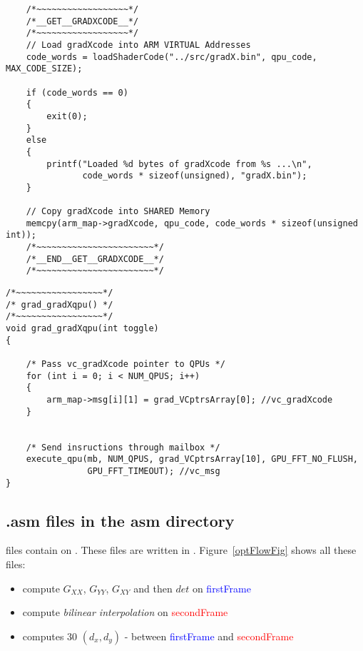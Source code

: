 \begin{lstlisting}
    /*~~~~~~~~~~~~~~~~~~*/
    /*__GET__GRADXCODE__*/
    /*~~~~~~~~~~~~~~~~~~*/
    // Load gradXcode into ARM VIRTUAL Addresses
    code_words = loadShaderCode("../src/gradX.bin", qpu_code, MAX_CODE_SIZE);

    if (code_words == 0)
    {
        exit(0);
    }
    else
    {
        printf("Loaded %d bytes of gradXcode from %s ...\n",
               code_words * sizeof(unsigned), "gradX.bin");
    }

    // Copy gradXcode into SHARED Memory
    memcpy(arm_map->gradXcode, qpu_code, code_words * sizeof(unsigned int));
    /*~~~~~~~~~~~~~~~~~~~~~~~*/
    /*__END__GET__GRADXCODE__*/
    /*~~~~~~~~~~~~~~~~~~~~~~~*/
\end{lstlisting}

\begin{lstlisting}
/*~~~~~~~~~~~~~~~~~*/
/* grad_gradXqpu() */
/*~~~~~~~~~~~~~~~~~*/
void grad_gradXqpu(int toggle)
{

    /* Pass vc_gradXcode pointer to QPUs */
    for (int i = 0; i < NUM_QPUS; i++)
    {
        arm_map->msg[i][1] = grad_VCptrsArray[0]; //vc_gradXcode
    }


    /* Send insructions through mailbox */
    execute_qpu(mb, NUM_QPUS, grad_VCptrsArray[10], GPU_FFT_NO_FLUSH,
                GPU_FFT_TIMEOUT); //vc_msg
}
\end{lstlisting}


\subsection{.asm files in the asm directory}

 files contain  on \vc. These files are written in . Figure~\ref{optFlowFig} shows all these files:
\begin{itemize}
	\item {} compute $G_{XX}$, $G_{YY}$, $G_{XY}$ and then $det$ on \textcolor{blue}{firstFrame}
	\item {} compute \emph{bilinear interpolation} on \textcolor{red}{secondFrame}
	\item {} computes 30 $(d_{x},d_{y})$ - \flow{} between \textcolor{blue}{firstFrame} and \textcolor{red}{secondFrame}
\end{itemize}

